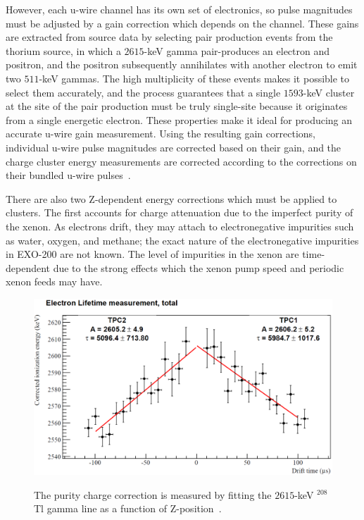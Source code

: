 However, each u-wire channel has its own set of electronics, so pulse magnitudes must be adjusted by a gain correction which depends on the channel.  These gains are extracted from source data by selecting pair production events from the thorium source, in which a $2615$-keV gamma pair-produces an electron and positron, and the positron subsequently annihilates with another electron to emit two $511$-keV gammas.  The high multiplicity of these events makes it possible to select them accurately, and the process guarantees that a single $1593$-keV cluster at the site of the pair production must be truly single-site because it originates from a single energetic electron.  These properties make it ideal for producing an accurate u-wire gain measurement.  Using the resulting gain corrections, individual u-wire pulse magnitudes are corrected based on their gain, and the charge cluster energy measurements are corrected according to the corrections on their bundled u-wire pulses~\cite{EnergyDocumentRun2a}.

There are also two Z-dependent energy corrections which must be applied to clusters.  The first accounts for charge attenuation due to the imperfect purity of the xenon.  As electrons drift, they may attach to electronegative impurities such as water, oxygen, and methane; the exact nature of the electronegative impurities in EXO-200 are not known.  The level of impurities in the xenon are time-dependent due to the strong effects which the xenon pump speed and periodic xenon feeds may have.

\begin{figure}
\begin{center}
\includegraphics[keepaspectratio=true,width=\textwidth]{LongThPurityMeasurement.png}
\end{center}
\renewcommand{\baselinestretch}{1}
\small\normalsize
\begin{quote}
\caption{The purity charge correction is measured by fitting the $2615$-keV $^{208}$Tl gamma line as a function of Z-position~\cite{EnergyDocumentRun2ab}.}
\label{fig:ThPurityMeasurement}
\end{quote}
\end{figure}
\renewcommand{\baselinestretch}{2}
\small\normalsize

